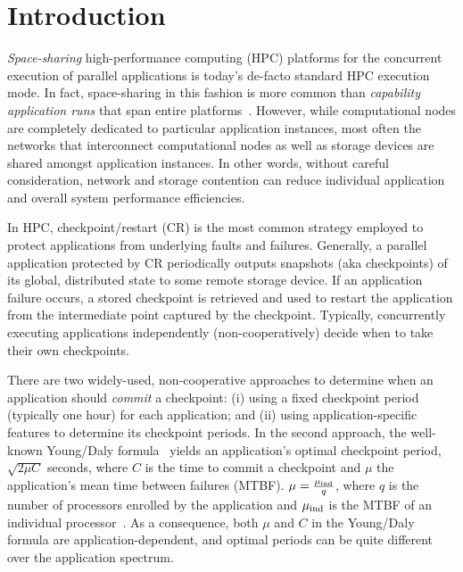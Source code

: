 \section{Introduction}
\label{sec:intro}

\emph{Space-sharing} high-performance computing (HPC) platforms for the concurrent
execution of parallel applications is today's de-facto standard HPC execution
mode. In fact, space-sharing in this fashion is more common than \emph{capability
  application runs} that span entire platforms~\cite{xx}. However, while
computational nodes are completely dedicated to particular application instances,
most often the networks that interconnect computational nodes as well as storage
devices are shared amongst application instances. In other words, without careful
consideration, network and storage contention can reduce individual application and
overall system performance efficiencies.

In HPC, checkpoint/restart (CR) is the most common strategy employed to protect
applications from underlying faults and failures. Generally, a parallel application
protected by CR periodically outputs snapshots (aka checkpoints) of its global,
distributed state to some remote storage device. If an application failure occurs, a
stored checkpoint is retrieved and used to restart the application from the
intermediate point captured by the checkpoint. Typically, concurrently executing
applications independently (non-cooperatively) decide when to take their own
checkpoints.

There are two widely-used, non-cooperative approaches to determine when an
application should \emph{commit} a checkpoint: (i) using a fixed checkpoint period
(typically one hour) for each application; and (ii) using application-specific
features to determine its checkpoint periods. In the second approach, the well-known
Young/Daly formula~\cite{young74,daly04} yields an application's optimal checkpoint
period, $\sqrt{2 \mu C}$ seconds, where $C$ is the time to commit a checkpoint and
$\mu$ the application's mean time between failures (MTBF). $\mu = \frac{\mu_{\text{ind}}}{q}$,
where $q$ is the number of processors enrolled by the application and $\mu_{\text{ind}}$ is the
MTBF of an individual processor~\cite{springer-monograph}. As a consequence, both
$\mu$ and $C$ in the Young/Daly formula are application-dependent, and optimal
periods can be quite different over the application spectrum.

